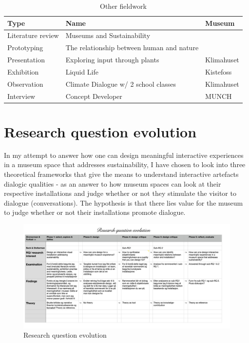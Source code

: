 \begin{table}[h]
\centering
\begin{tabular}{l | l| l}
\textbf{Type} & \textbf{Name} & \textbf{Museum}\\
\hline
Literature review & Museums and Sustainability & \\
Prototyping & The relationship between human and nature \\
Presentation & Exploring input through plants & Klimahuset\\
Exhibition & Liquid Life & Kistefoss \\
Observation & Climate Dialogue w/ 2 school classes & Klimahuset\\
Interview & Concept Developer & MUNCH\\
\end{tabular}
\caption{Other fieldwork}
\label{tab:abc}
\end{table}


\section*{Research question evolution}
In my attempt to answer how one can design meaningful interactive experiences in a museum space that addresses sustainability, I have chosen to look into three theoretical frameworks that give the means to understand interactive artefacts dialogic qualities - as an answer to how museum spaces can look at their respective installations and judge whether or not they stimulate the visitor to dialogue (conversations). The hypothesis is that there lies value for the museum to judge whether or not their installations promote dialogue. 

\begin{figure}[H]
\includegraphics[width=21cm, angle=90]{pictures/process/rq_evolution.png}
\caption{Research question evolution}
\centering 
\end{figure}


